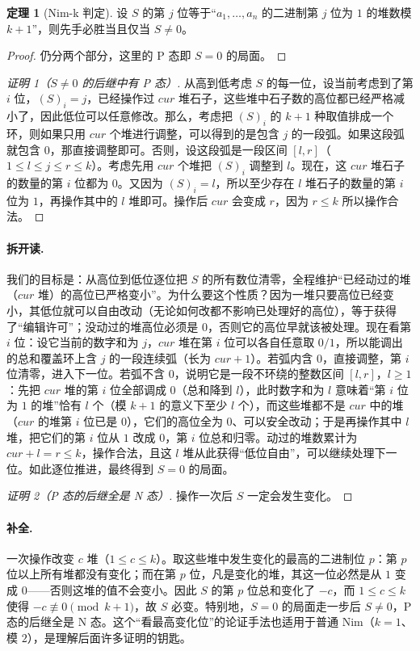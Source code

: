 \documentclass[UTF8,a4paper,11pt,oneside,openany,fontset=fandol]{ctexbook}
\theoremstyle{definition}
\newtheorem{theorem}[definition]{定理}
\begin{document}
\begin{theorem}[Nim-k 判定]\label{thm:nimk}
设 $S$ 的第 $j$ 位等于“$a_1,\ldots,a_n$ 的二进制第 $j$ 位为 $1$ 的堆数模 $k+1$”，则先手必胜当且仅当 $S\ne0$。
\end{theorem}
\begin{proof}
仍分两个部分，这里的 P 态即 $S=0$ 的局面。
\end{proof}

\begin{proof}[证明 1（$S\ne0$ 的后继中有 P 态）]
从高到低考虑 $S$ 的每一位，设当前考虑到了第 $i$ 位，$(S)_i=j$，已经操作过 $cur$ 堆石子，这些堆中石子数的高位都已经严格减小了，因此低位可以任意修改。那么，考虑把 $(S)_i$ 的 $k+1$ 种取值排成一个环，则如果只用 $cur$ 个堆进行调整，可以得到的是包含 $j$ 的一段弧。如果这段弧就包含 $0$，那直接调整即可。否则，设这段弧是一段区间 $[l,r]$（$1\le l\le j\le r\le k$）。考虑先用 $cur$ 个堆把 $(S)_i$ 调整到 $l$。现在，这 $cur$ 堆石子的数量的第 $i$ 位都为 $0$。又因为 $(S)_i=l$，所以至少存在 $l$ 堆石子的数量的第 $i$ 位为 $1$，再操作其中的 $l$ 堆即可。操作后 $cur$ 会变成 $r$，因为 $r\le k$ 所以操作合法。
\end{proof}

\paragraph{拆开读.} 我们的目标是：从高位到低位逐位把 $S$ 的所有数位清零，全程维护“已经动过的堆（$cur$ 堆）的高位已严格变小”。为什么要这个性质？因为一堆只要高位已经变小，其低位就可以自由改动（无论如何改都不影响已处理好的高位），等于获得了“编辑许可”；没动过的堆高位必须是 $0$，否则它的高位早就该被处理。现在看第 $i$ 位：设它当前的数字和为 $j$，$cur$ 堆在第 $i$ 位可以各自任意取 $0/1$，所以能调出的总和覆盖环上含 $j$ 的一段连续弧（长为 $cur+1$）。若弧内含 $0$，直接调整，第 $i$ 位清零，进入下一位。若弧不含 $0$，说明它是一段不环绕的整数区间 $[l,r]$，$l\ge1$：先把 $cur$ 堆的第 $i$ 位全部调成 $0$（总和降到 $l$），此时数字和为 $l$ 意味着“第 $i$ 位为 $1$ 的堆”恰有 $l$ 个（模 $k+1$ 的意义下至少 $l$ 个），而这些堆都不是 $cur$ 中的堆（$cur$ 的堆第 $i$ 位已是 $0$），它们的高位全为 $0$、可以安全改动；于是再操作其中 $l$ 堆，把它们的第 $i$ 位从 $1$ 改成 $0$，第 $i$ 位总和归零。动过的堆数累计为 $cur+l=r\le k$，操作合法，且这 $l$ 堆从此获得“低位自由”，可以继续处理下一位。如此逐位推进，最终得到 $S=0$ 的局面。

\begin{proof}[证明 2（P 态的后继全是 N 态）]
操作一次后 $S$ 一定会发生变化。
\end{proof}
\paragraph{补全.} 一次操作改变 $c$ 堆（$1\le c\le k$）。取这些堆中发生变化的最高的二进制位 $p$：第 $p$ 位以上所有堆都没有变化；而在第 $p$ 位，凡是变化的堆，其这一位必然是从 $1$ 变成 $0$——否则这堆的值不会变小。因此 $S$ 的第 $p$ 位总和变化了 $-c$，而 $1\le c\le k$ 使得 $-c\not\equiv0\pmod{k+1}$，故 $S$ 必变。特别地，$S=0$ 的局面走一步后 $S\ne0$，P 态的后继全是 N 态。这个“看最高变化位”的论证手法也适用于普通 Nim（$k=1$、模 $2$），是理解后面许多证明的钥匙。
\end{document}
